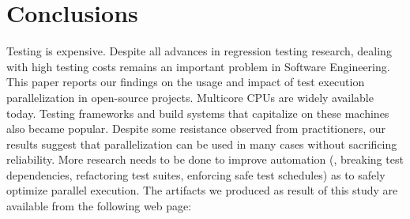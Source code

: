\chapter{Conclusions}

Testing is expensive.  Despite all advances in regression testing
research, dealing with high testing costs remains an important problem
in Software Engineering.  This paper reports our findings on the usage
and impact of test execution parallelization in open-source projects.
Multicore CPUs are widely available today.  Testing frameworks and
build systems that capitalize on these machines also became popular.
Despite some resistance observed from practitioners, our results
suggest that parallelization can be used in many cases without
sacrificing reliability. More research needs to be done to improve
automation (\eg{}, breaking test dependencies, refactoring test
suites, enforcing safe test schedules) as to safely optimize parallel
execution.  The artifacts we produced as result of this study are
available from the following web page:

\begin{center}
  \webpage{}
\end{center}  








